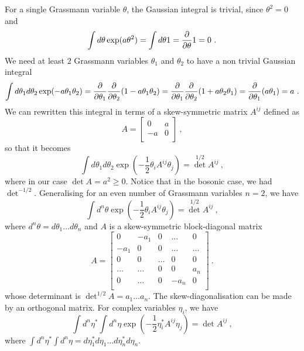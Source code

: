     For a single Grassmann variable $\theta$, the Gaussian integral is trivial, since $\theta^2 = 0$ and 
    \begin{equation*}
        \int d\theta \exp(a \theta^2) = \int d\theta 1 =  \frac{\partial}{\partial\theta} 1 = 0 ~.
    \end{equation*}
    We need at least $2$ Grassmann variables $\theta_1$ and $\theta_2$ to have a non trivial Gaussian integral 
    \begin{equation*}
        \int d\theta_1 d \theta_2 \exp(- a \theta_1 \theta_2) = \frac{\partial}{\partial\theta_1} \frac{\partial}{\partial\theta_2} (1 - a \theta_1 \theta_2) = \frac{\partial}{\partial\theta_1} \frac{\partial}{\partial\theta_2} (1 + a \theta_2 \theta_1 ) = \frac{\partial}{\partial\theta_1} (a \theta_1) = a ~.
    \end{equation*}
    We can rewritten this integral in terms of a skew-symmetric matrix $A^{ij}$ defined as 
    \begin{equation*}
        A = \begin{bmatrix}
            0 & a \\ -a & 0 \\
        \end{bmatrix} ~,
    \end{equation*}
    so that it becomes 
    \begin{equation*}
        \int d\theta_1 d \theta_2 \exp(- \frac{1}{2} \theta_i A^{ij} \theta_j) = \det^{1/2} A^{ij} ~,
    \end{equation*}
    where in our case $\det A = a^2 \geq 0$. Notice that in the bosonic case, we had $\det^{- 1/2}$. Generalising for an even number of Grassmann variables $n = 2$, we have 
    \begin{equation*}
        \int d^n \theta \exp(- \frac{1}{2} \theta_i A^{ij} \theta_j) = \det^{1/2} A^{ij} ~,
    \end{equation*}
    where $d^n \theta = d\theta_1 \ldots d\theta_n$ and $A$ is a skew-symmetric block-diagonal matrix 
    \begin{equation*}
        A = \begin{bmatrix}
            0 & -a_1 & 0 & \ldots & 0 \\
            - a_1 & 0 & 0 & \ldots & \ldots \\
            0 &  0 & \ldots & 0 & 0 \\
            \ldots &  \ldots & 0 & 0 & a_n \\
            0 &  \ldots & 0 & - a_n & 0 \\
        \end{bmatrix} ~.
    \end{equation*}
    whose determinant is $\det^{1/2} A = a_1 \ldots a_n$. The skew-diagonalisation can be made by an orthogonal matrix. For complex variables $\eta_i$, we have 
    \begin{equation*}
        \int d^n \eta^*  \int d^n \eta \exp(- \frac{1}{2} \eta_i^* A^{ij} \eta_j) = \det A^{ij} ~,
    \end{equation*}
    where $\int d^n \eta^* \int d^n \eta = d \eta_1^* d \eta_1 \ldots d \eta_n^* d \eta_n$.

